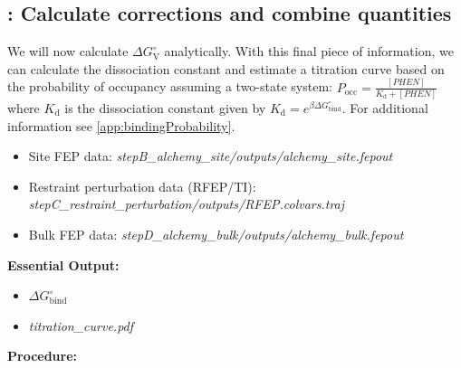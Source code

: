 \documentclass[9pt,tutorial,pubversion]{Styling/livecoms}
\newcommand{\filepath}[1]{\textit{#1}}
\begin{document}
\subsection{\hspace{-1em}: Calculate corrections and combine quantities}\label{step:combinequantities}
    \begin{tcolorbox}[colback=blue!5!white,colframe=blue!75!black]
    We will now calculate $\Delta G^\circ_\mathrm{V}$ analytically. With this final piece of information, we can calculate the dissociation constant and estimate a titration curve based on the probability of occupancy assuming a two-state system: $P_\mathrm{occ}=\frac{[PHEN]}{K_\mathrm{d}+[PHEN]}$ where ${K_\mathrm{d}}$ is the dissociation constant given by ${K_\mathrm{d}}=e^{\beta \Delta G^\circ_\mathrm{bind}}$. For additional information see \ref{app:bindingProbability}.
    \end{tcolorbox}
    \begin{itemize}
        \item Site FEP data: \filepath{stepB\_alchemy\_site/outputs/alchemy\_site.fepout} 
        \item Restraint perturbation data (RFEP/TI): \filepath{stepC\_restraint\_perturbation/outputs/RFEP.colvars.traj}
        \item Bulk FEP data: \filepath{stepD\_alchemy\_bulk/outputs/alchemy\_bulk.fepout}
    \end{itemize}
    \textbf{Essential Output:}
    \begin{itemize}
        \item $\Delta G^\circ_{\mathrm{bind}}$
        \item \filepath{titration\_curve.pdf}
    \end{itemize}
    \textbf{Procedure:}
\end{document}
